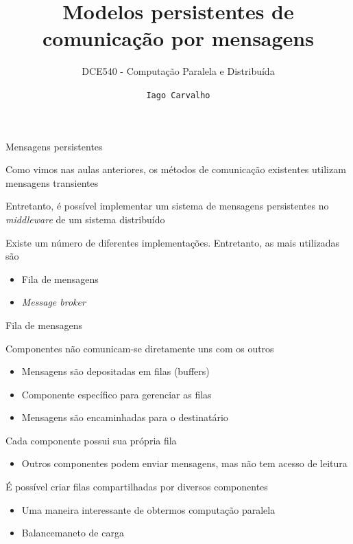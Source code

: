 \documentclass[compress]{beamer}
\title{Modelos persistentes de comunicação por mensagens}
\subtitle{DCE540 - Computação Paralela e Distribuída}
\author{\texttt{Iago Carvalho}}
\institute{\texttt{Departamento de Ciência da Computação}}
\begin{document}
\begin{frame}
\titlepage

\end{frame}


\begin{frame}{Mensagens persistentes}

Como vimos nas aulas anteriores, os métodos de comunicação existentes utilizam mensagens transientes

\vspace{0.5cm}

Entretanto, é possível implementar um sistema de mensagens persistentes no \textit{middleware} de um sistema distribuído

\vspace{0.5cm}

Existe um número de diferentes implementações. Entretanto, as mais utilizadas são
\begin{itemize}
    \item Fila de mensagens
    \item \textit{Message broker}
\end{itemize}

\end{frame}


\begin{frame}{Fila de mensagens}

Componentes não comunicam-se diretamente uns com os outros
\begin{itemize}
    \item Mensagens são depositadas em filas (buffers)
    \item Componente específico para gerenciar as filas
    \item Mensagens são encaminhadas para o destinatário
\end{itemize} 

\vspace{0.5cm}

Cada componente possui sua própria fila
\begin{itemize}
    \item Outros componentes podem enviar mensagens, mas não tem acesso de leitura
\end{itemize}

\vspace{0.5cm}

É possível criar filas compartilhadas por diversos componentes
\begin{itemize}
    \item Uma maneira interessante de obtermos computação paralela
    \item Balancemaneto de carga
\end{itemize}

\end{frame}
\end{document}
